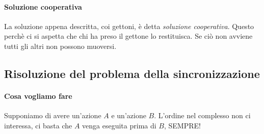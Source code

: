 \paragraph{Soluzione cooperativa} La soluzione appena descritta, coi gettoni, è detta \emph{soluzione cooperativa}. Questo perchè ci si aspetta che chi ha preso il gettone lo restituisca. Se ciò non avviene tutti gli altri non possono muoversi.




\subsection{Risoluzione del problema della sincronizzazione}
\paragraph{Cosa vogliamo fare} Supponiamo di avere un'azione $A$ e un'azione $B$. L'ordine nel complesso non ci interessa, ci basta che $A$ venga eseguita prima di $B$, SEMPRE!
